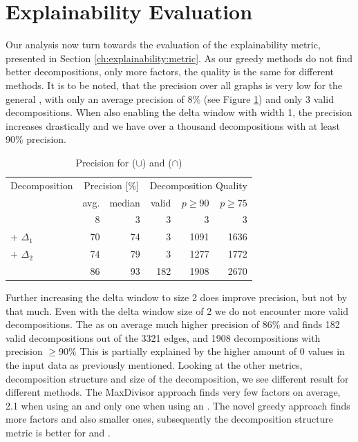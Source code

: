 \section{Explainability Evaluation}
\label{ch:Evaluation:explainability}
Our analysis now turn towards the evaluation of the explainability metric, presented in Section \ref{ch:explainability:metric}.
As our greedy methods do not find better decompositions, only more factors, the quality is the same for different methods.
It is to be noted, that the precision over all graphs is very low for the general \orDecomp, with only an average precision of 8\% (see Figure \ref{tab:eval-precision}) and only 3 valid decompositions.
When also enabling the delta window with width 1, the precision increases drastically and we have over a thousand decompositions with at least 90\% precision. 
\begin{table}[h]
	\centering
	\begin{tabular}{l|rr|rrr}
		\multicolumn{1}{c}{Decomposition} & \multicolumn{2}{c}{Precision [\%]} & \multicolumn{3}{c}{Decomposition Quality} \\
		& avg. & median & valid & $p \geq 90$ & $p \geq 75$ \\
		\hline
		\orDecomp & 8 & 3 & 3 & 3 & 3 \\
		\orDecomp + $\Delta_1$ & 70 & 74 & 3 & 1091 & 1636 \\
		\orDecomp + $\Delta_2$ & 74 & 79 & 3 & 1277 & 1772 \\
		\andDecomp & 86 & 93 &  182 & 1908 & 2670\\
	\end{tabular}
	\caption{Precision for \orDecomp ($\cup$) and \andDecomp ($\cap$)}
	\label{tab:eval-precision}
\end{table}
Further increasing the delta window to size 2 does improve precision, but not by that much.
Even with the delta window size of 2 we do not encounter more valid decompositions.
The \andDecomp as on average much higher precision of 86\% and finds 182 valid decompositions out of the 3321 edges, and 1908 decompositions with precision $\geq 90\%$
This is partially explained by the higher amount of 0 values in the input data as previously mentioned.
Looking at the other metrics, decomposition structure and size of the decomposition, we see different result for different methods.
The MaxDivisor approach finds very few factors on average, 2.1 when using an \andDecomp and only one when using an \orDecomp.
The novel greedy approach finds more factors and also smaller ones, subsequently the decomposition structure metric is better for \andDecomp and \orDecomp.
